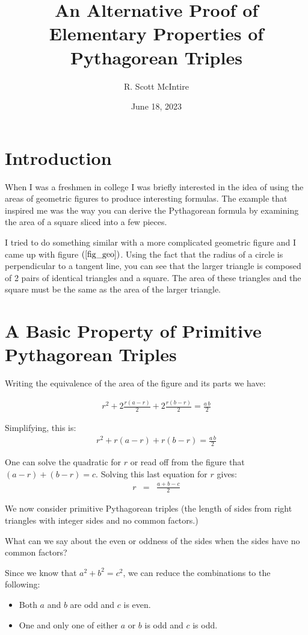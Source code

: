 \documentclass[12pt]{article}
\title{An Alternative Proof of Elementary Properties of Pythagorean Triples}
\author{R. Scott McIntire}
\date{June 18, 2023}
\begin{document}
\maketitle

\section{Introduction}
When I was a freshmen in college I was briefly interested in the idea of using the areas of geometric figures to
produce interesting formulas. The example that inspired me was the way you can derive the Pythagorean formula
by examining the area of a square sliced into a few pieces.

I tried to do something similar with a more complicated geometric figure and I came up with figure $(\ref{fig_geo})$.
Using the fact that the radius of a circle is perpendicular to a tangent line, you can see that the larger triangle
is composed of 2 pairs of identical triangles and a square. The area of these triangles and the square must be
the same as the area of the larger triangle. 

\section{A Basic Property of Primitive Pythagorean Triples}
Writing the equivalence of the area of the figure and its parts we have:

\begin{eqnarray}
r^2 + 2 \frac{r(a - r)}{2} + 2 \frac{r(b-r)}{2} = \frac{a\, b}{2} 
\end{eqnarray}

Simplifying, this is:
\begin{eqnarray}
r^2 + r(a - r) + r(b-r) = \frac{a\, b}{2} \label{area} 
\end{eqnarray}

One can solve the quadratic for $r$ or read off from the figure that $(a-r) + (b-r) = c$. Solving this last equation for $r$ gives:
\begin{eqnarray}
  r & = & \frac{a + b - c}{2} \label{radius}
\end{eqnarray}

We now consider primitive Pythagorean triples (the length of sides from right triangles with integer sides and no common factors.)

What can we say about the even or oddness of the sides when the sides have no common factors? 

Since we know that $a^2 + b^2 = c^2$, we can reduce the combinations to the following:
\begin{itemize}
  \item{Both $a$ and $b$ are odd and $c$ is even.}
  \item{One and only one of either $a$ or $b$ is odd and $c$ is odd.}
\end{itemize}
\end{document}
